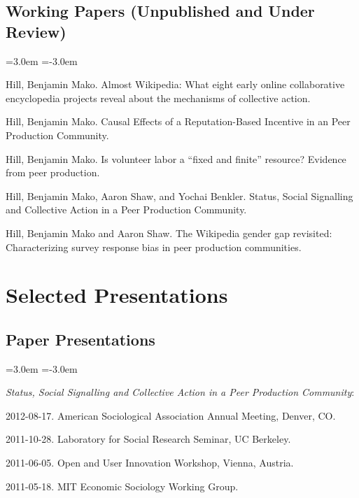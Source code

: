 \documentclass[10pt]{article}
\newenvironment{cvlist}{
\begin{list}{}{\leftmargin=3.0em \itemindent=-3.0em}
  \setlength{\itemsep}{0pt}
  \setlength{\parskip}{0em}
  \setlength{\parsep}{1em}
  \setlength{\parindent}{0em}}
{\vspace{1em}
\end{list}}
\begin{document}
\subsection{Working Papers (Unpublished and Under Review)}
\begin{cvlist}
\item Hill, Benjamin Mako. Almost Wikipedia: What eight early online
  collaborative encyclopedia projects reveal about the mechanisms of
  collective action.
\item Hill, Benjamin Mako. Causal Effects of a Reputation-Based
  Incentive in an Peer Production Community.
\item Hill, Benjamin Mako. Is volunteer labor a ``fixed and finite''
  resource? Evidence from peer production.
\item Hill, Benjamin Mako, Aaron Shaw, and Yochai Benkler. Status,
  Social Signalling and Collective Action in a Peer Production
  Community.
\item Hill, Benjamin Mako and Aaron Shaw. The Wikipedia gender gap
  revisited: Characterizing survey response bias in peer production
  communities.
\end{cvlist}

\section{Selected Presentations}

\subsection{Paper Presentations}

\begin{cvlist}
\item \emph{Status, Social Signalling and Collective Action in a Peer
  Production Community}:
\item 2012-08-17. American Sociological Association Annual Meeting, Denver, CO.
\item 2011-10-28. Laboratory for Social Research Seminar, UC Berkeley.
\item 2011-06-05. Open and User Innovation Workshop, Vienna, Austria.
\item 2011-05-18. MIT Economic Sociology Working Group.
\end{cvlist}
\end{document}
